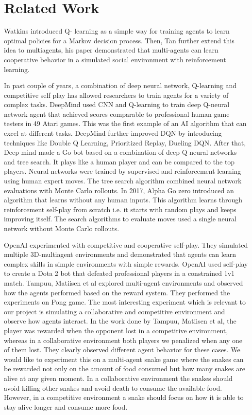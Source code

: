 \documentclass[conference,10pt]{IEEEtran}
\begin{document}
	\section{Related Work}
	Watkins\cite{sp1} introduced Q- learning as a simple way for training agents to learn
	optimal policies for a Markov decision process. Then, Tan\cite{sp2} further extend
	this idea to multiagents, his paper demonstrated that
	multi-agents can learn cooperative behavior in a simulated social environment with reinforcement learning.
	
	In past couple of years, a combination of deep neural network, Q-learning and
	competitive self play has allowed researchers to train agents for a variety
	of complex tasks. DeepMind\cite{sp3} used CNN and Q-learning to train deep Q-neural
	network agent that achieved scores comparable to professional human game
	testers in 49 Atari games. This was the first example of an AI algorithm
	that can excel at different tasks. DeepMind further improved DQN by introducing
	techniques like Double Q Learning\cite{sp4}, Prioritized Replay\cite{sp5}, Dueling DQN\cite{sp6}.  After
	that, Deep mind made a Go-bot\cite{sp7} based on a combination of deep Q-neural
	networks and tree search. It plays like a human player and can be compared to the top players. Neural networks were trained by supervised and reinforcement learning using human
	expert moves. The tree search algorithm
	combined neural network evaluations with Monte Carlo rollouts. In 2017, Alpha
	Go zero\cite{sp8} introduced an algorithm that learns without any human inputs.
	This algorithm learns through reinforcement self-play from scratch i.e. it starts
	with random plays and keeps improving itself. The search algorithms to evaluate moves used a single
	neural network without Monte Carlo rollouts.
	
	OpenAI experimented with competitive and cooperative self-play\cite{sp9}. They simulated
	multiple 3D-multiagent environments and demonstrated that agents can learn
	complex skills in simple environments with simple rewards. OpenAI\cite{sp10} used
	self-play to create a Dota 2 bot that defeated professional players in a
	constrained 1v1 match.
	\break
	\break
	Tampuu, Matiisen et al\cite{sd7} explored multi-agent environments and observed how the agents performed based on the reward system. They performed the experiments on Pong game. The most interesting experiment which is relevant to our project is simulating a collaborative and competitive environment and observe how agents interact. In the work done by Tampuu, Matiisen et al\cite{sd3}, the player was rewarded when the opponent lost in a competitive environment, whereas in a collaborative environment both players we penalized when any one of them lost. They clearly observed different agent behavior for these cases.
	\break
	\break
	We would like to experiment this on a multi-agent snake game where the snakes can be rewarded not only on the amount of food consumed but how many snakes are alive at any given moment. In a collaborative environment the snakes should avoid killing other snakes and avoid death to consume the available food. However, in a competitive environment a snake should focus on how it is able to stay alive longer and consume more food.
	
\end{document}
